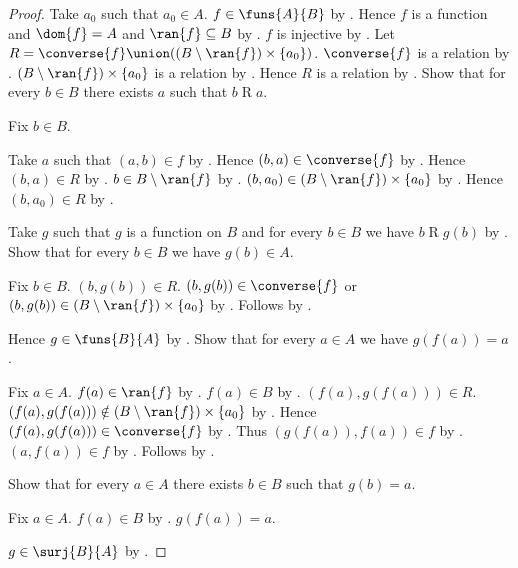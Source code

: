 \begin{proof}
    Take $a_0$ such that $a_0\in A$.
    $f\in\funs{A}{B}$ by .
    Hence $f$ is a function and $\dom{f}=A$ and $\ran{f}\subseteq B$
        by .
    $f$ is injective
        by .
    Let $R=\converse{f}\union((B\setminus\ran{f})\times\{a_0\})$.
    $\converse{f}$ is a relation by .
    $(B\setminus\ran{f})\times\{a_0\}$ is a relation
        by .
    Hence $R$ is a relation by .
    Show that for every $b\in B$ there exists $a$ such that $b\mathrel{R}a$.
    \begin{subproof}
        Fix $b\in B$.
        \begin{byCase}
                Take $a$ such that $(a,b)\in f$ by .
                Hence $(b,a)\in\converse{f}$ by .
                Hence $(b,a)\in R$ by .
                $b\in B\setminus\ran{f}$ by .
                $(b,a_0)\in(B\setminus\ran{f})\times\{a_0\}$
                    by .
                Hence $(b,a_0)\in R$ by .
        \end{byCase}
    \end{subproof}
    Take $g$ such that $g$ is a function on $B$ and for every $b\in B$
        we have $b\mathrel{R}g(b)$
        by .
    Show that for every $b\in B$ we have $g(b)\in A$.
    \begin{subproof}
        Fix $b\in B$.
        $(b,g(b))\in R$.
        $(b,g(b))\in\converse{f}$ or
            $(b,g(b))\in(B\setminus\ran{f})\times\{a_0\}$
            by .
        Follows by
            .
    \end{subproof}
    Hence $g\in\funs{B}{A}$ by .
    Show that for every $a\in A$ we have $g(f(a))=a$.
    \begin{subproof}
        Fix $a\in A$.
        $f(a)\in\ran{f}$ by .
        $f(a)\in B$ by .
        $(f(a),g(f(a)))\in R$.
        $(f(a),g(f(a)))\notin
            (B\setminus\ran{f})\times\{a_0\}$
            by .
        Hence $(f(a),g(f(a)))\in\converse{f}$
            by .
        Thus $(g(f(a)),f(a))\in f$ by .
        $(a,f(a))\in f$ by .
        Follows by .
    \end{subproof}
    Show that for every $a\in A$ there exists $b\in B$ such that
        $g(b)=a$.
    \begin{subproof}
        Fix $a\in A$.
        $f(a)\in B$ by .
        $g(f(a))=a$.
    \end{subproof}
    $g\in\surj{B}{A}$ by .
\end{proof}

